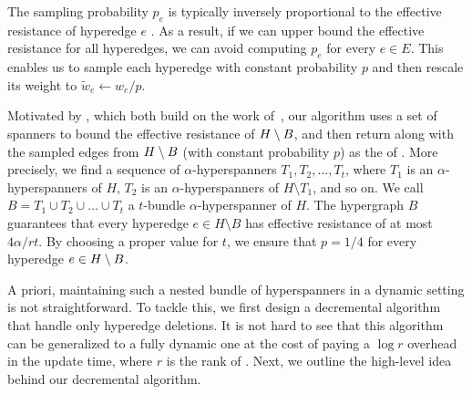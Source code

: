 The sampling probability \( p_e \) is typically inversely proportional to the effective resistance of hyperedge  \( e \) \cite{Bansal:2019aa}. As a result, if we can upper bound the effective resistance for all hyperedges, we can avoid computing \( p_e \) for every \( e \in E \).
This enables us to sample each hyperedge with constant probability \( p \) and then rescale its weight to \( \tilde w_e \gets  w_e/p \).

Motivated by \cite{Abraham:2016aa,Oko:2023aa}, which both build on the work of~\cite{Koutis:2016aa}, our algorithm uses a set of spanners  to bound the effective resistance of \( { H} \setminus {\ensuremath{ B}} \), and then return  along with the sampled edges from \( { H} \setminus {\ensuremath{ B}} \) (with constant probability \( p \)) as the \SpectralHypersparsifier{} of .
More precisely, we find a sequence of \( \alpha \)-hyperspanners \( T_1, T_2, \dots, T_t \), where \( T_1 \) is an \( \alpha \)-hyperspanners of \( H \), \( T_2 \) is an \( \alpha \)-hyperspanners of \( H \setminus T_1 \), and so on.
We call \( B = T_1 \cup T_2 \cup \dots \cup T_t \) a \( t \)-bundle \( \alpha \)-hyperspanner of \( H \). 
The hypergraph $B$ guarantees that every hyperedge \( e \in H \setminus B \) has effective resistance of at most \( 4 \alpha / rt \).
By choosing a proper value for \( t \), we ensure that \( p = 1/4 \) for every hyperedge \( e \in {\ensuremath{ H}} \setminus {\ensuremath{ B}} \).


 







A priori, maintaining such a nested bundle of hyperspanners in a dynamic setting is not straightforward. To tackle this, we first design a decremental algorithm that handle only hyperedge deletions. It is not hard to see that this algorithm can be generalized to a fully dynamic one at the cost of paying a \( \log r \) overhead in the update time, where \( r \) is the rank of .
Next, we outline the high-level idea behind our decremental algorithm.




